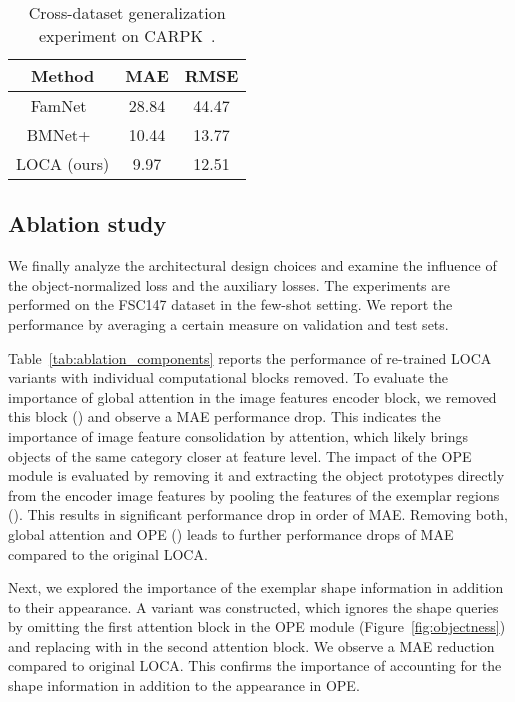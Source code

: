 \documentclass[10pt,twocolumn,letterpaper]{article}
\newcommand*\circledd[1]{\tikz[baseline=(char.base)]{
            \node[shape=circle,draw,inner sep=0.15pt] (char) {#1};}}
\newcommand{\first}[1]{{#1\raisebox{0.8pt}{\footnotesize \color{gold} \circledd{1}}}}
\newcommand{\second}[1]{{#1\raisebox{0.8pt}{\footnotesize \color{silver} \circledd{2}}}}
\newcommand{\third}[1]{{#1\raisebox{0.8pt}{\footnotesize \color{bronze} \circledd{3}}}}
\begin{document}
\begin{table}[htbp]
    \centering
    \begin{tabular}{c c c}
        \toprule
        Method & MAE & RMSE \\ 
        \midrule
        FamNet~\cite{famnet} & \third{28.84} & \third{44.47} \\
        BMNet+~\cite{bmnet} & \second{10.44} & \second{13.77} \\
        LOCA (ours) & \first{9.97} & \first{12.51} \\
        \bottomrule
    \end{tabular}
    \caption{Cross-dataset generalization experiment on CARPK~\cite{carpk}. 
}
    \label{tab:cars}
\end{table}

\subsection{Ablation study}
\label{sec:ablation}



We finally analyze the architectural design choices and examine the influence of the object-normalized loss and the auxiliary losses. 
The experiments are performed on the FSC147 dataset in the few-shot setting. 
We report the performance by averaging a certain measure on validation and test sets. 




Table~\ref{tab:ablation_components} reports the performance of re-trained LOCA variants with individual computational blocks removed. 
To evaluate the importance of global attention in the image features encoder block, we removed this block () and observe a   MAE performance drop. This indicates the importance of image feature consolidation by attention, which likely brings objects of the same category closer at feature level. 
The impact of the OPE module is evaluated by removing it and extracting the object prototypes directly from the encoder image features by pooling the features of the exemplar regions (). This results in significant performance drop in order of  MAE.
Removing both, global attention and OPE () leads to further performance drops of  MAE compared to the original LOCA.

Next, we explored the importance of the exemplar shape information in addition to their appearance. A variant  was constructed, which ignores the shape queries  by omitting the first attention block in the OPE module (Figure~\ref{fig:objectness}) and replacing 
 with  in the second attention block. We observe a  MAE reduction compared to original LOCA. This confirms the importance of accounting for the shape information in addition to the appearance in OPE.
\end{document}
